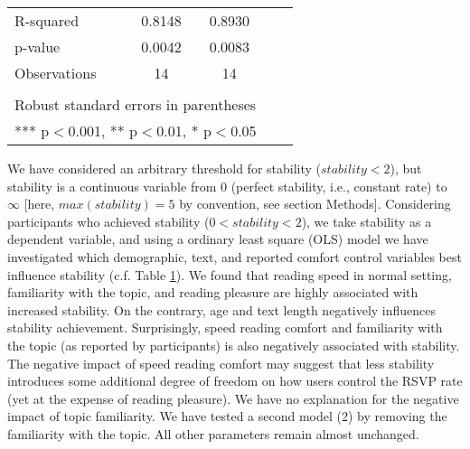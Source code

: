 \begin{table}[h!]
\begin{tabular}{lcccc}
		R-squared & 0.8148 & 0.8930 \\%
		p-value & 0.0042 & 0.0083\\
		Observations & 14 & 14 \\%
		&  &  \\
		\hline
		\multicolumn{3}{l}{ Robust standard errors in parentheses} \\
		\multicolumn{3}{l}{ *** p$<$0.001, ** p$<$0.01, * p$<$0.05} \\
	\end{tabular}
	\label{tab:reg}
\end{table}

We have considered an arbitrary threshold for stability ($stability < 2$), but stability is a continuous variable from 0 (perfect stability, i.e., constant rate) to $\infty$ [here, $max(stability) = 5$ by convention, see section Methods]. Considering participants who achieved stability ($ 0 < stability < 2$), we take stability as a dependent variable, and using a ordinary least square (OLS) model we have investigated which demographic, text, and reported comfort control variables best influence stability (c.f. Table \ref{tab:reg}). We found that reading speed in normal setting, familiarity with the topic, and reading pleasure are highly associated with increased stability. On the contrary, age and text length negatively influences stability achievement. Surprisingly, speed reading comfort and familiarity with the topic (as reported by participants) is also negatively associated with stability. The negative impact of speed reading comfort may suggest that less stability introduces some additional degree of freedom on how users control the RSVP rate (yet at the expense of reading pleasure). We have no explanation for the negative impact of topic familiarity. We have tested a second model (2) by removing the familiarity with the topic. All other parameters remain almost unchanged.

